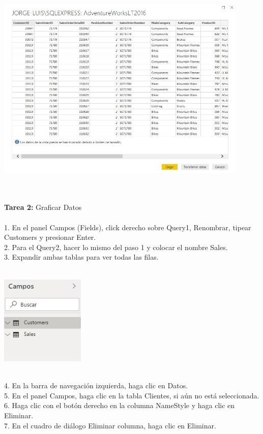 \documentclass[12pt,letterpaper]{article}
\begin{document}
\begin{flushleft}
\begin{itemize}
\begin{center}
	\end{center}
\textbf{ }\\
\textbf{ }\\
\begin{center}
	\includegraphics[width=12cm]{./Imagenes/image7} 
	\end{center}
\textbf{ }\\

\textbf{ }\\
\textbf{Tarea 2: }Graficar Datos  \\
\textbf{ }\\

1. En el panel Campos (Fields), click derecho sobre Query1, Renombrar, tipear Customers y presionar Enter.\\
2. Para el Query2, hacer lo mismo del paso 1 y colocar el nombre Sales.\\
3. Expandir ambas tablas para ver todas las filas.\\
\textbf{ }\\
\begin{center}
	\includegraphics[width=4cm]{./Imagenes/image8} 
	\end{center}
\textbf{ }\\
4. En la barra de navegación izquierda, haga clic en Datos.\\
5. En el panel Campos, haga clic en la tabla Clientes, si aún no está seleccionada.\\
6. Haga clic con el botón derecho en la columna NameStyle y haga clic en Eliminar.\\
7. En el cuadro de diálogo Eliminar columna, haga clic en Eliminar.\\


\end{itemize}
\end{flushleft}
\end{document}
